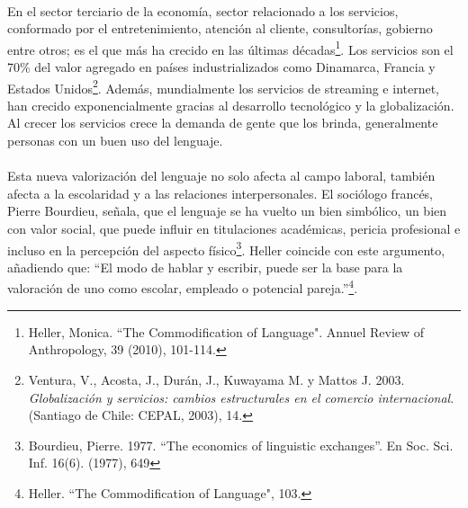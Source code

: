 \documentclass{article}
\begin{document}
    \paragraph{}
    En el sector terciario de la economía, sector relacionado a los servicios, conformado por el entretenimiento, atención al cliente, consultorías, gobierno entre otros; es el que más ha crecido en las últimas décadas\footnote{Heller, Monica. ``The Commodification of Language". Annuel Review of Anthropology, 39 (2010), 101-114.}. Los servicios son el 70\% del valor agregado en países industrializados como Dinamarca, Francia y Estados Unidos\footnote{Ventura, V., Acosta, J., Durán, J., Kuwayama M. y Mattos J. 2003. \emph{Globalización y servicios: cambios estructurales en el comercio internacional}. (Santiago de Chile: CEPAL, 2003), 14.}. Además, mundialmente los servicios de streaming e internet, han crecido exponencialmente gracias al desarrollo tecnológico y la globalización. Al crecer los servicios crece la demanda de gente que los brinda, generalmente personas con un buen uso del lenguaje.

    \paragraph{}
    Esta nueva valorización del lenguaje no solo afecta al campo laboral, también afecta a la escolaridad y a las relaciones interpersonales. El sociólogo francés, Pierre Bourdieu, señala, que el lenguaje se ha vuelto un bien simbólico, un bien con valor social, que puede influir en titulaciones académicas, pericia profesional e incluso en la percepción del aspecto físico\footnote{Bourdieu, Pierre. 1977. ``The economics of linguistic exchanges”. En Soc. Sci. Inf. 16(6). (1977), 649}. Heller coincide con este argumento, añadiendo que: ``El modo de hablar y escribir, puede ser la base para la valoración de uno como escolar, empleado o potencial pareja.”\footnote{Heller. ``The Commodification of Language", 103.}.
\end{document}
